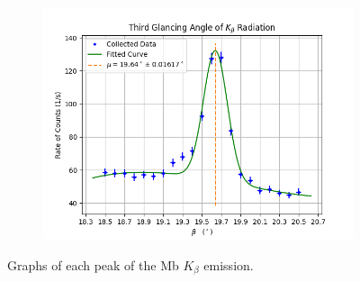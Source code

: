 \documentclass[twocolumn]{article}
\begin{document}
\begin{figure}[h!]
\begin{subfigure}{.33\textwidth}
					\begin{center}
						\includegraphics[width = \textwidth]{../Graphs/Peak 5}
					\end{center}
					\label{beta 3}
				\end{subfigure}
				\caption{Graphs of each peak of the Mb $K_\beta$ emission.}
				\label{fig: beta}
			\end{figure}
			
\end{document}
